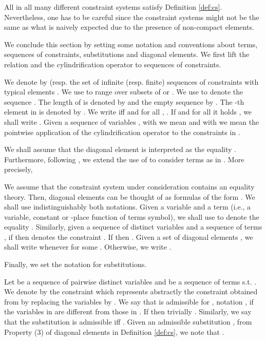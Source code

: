 \documentclass{tlp}
\begin{document}
All in all many different constraint systems satisfy Definition \ref{def:cs}. Nevertheless, one has to be careful since the constraint systems might not be the same as what is naively expected due to the presence of non-compact elements.

We conclude this section by setting some notation and conventions
about terms, sequences of constraints, substitutions and diagonal
elements. We first lift the relation  and the cylindrification
operator to sequences of constraints.

\begin{notation}\label{not:seq-constraints}
We denote  by   (resp.  the set of infinite (resp. finite) sequences of constraints with typical elements . We
use  to range over subsets of  or . 
We use  to denote the sequence .  The length of
 is denoted by  and the  empty sequence by . The
-th element in  is denoted by . 
 We write  iff  and for all , . If   and for all
 it holds , we shall write
. Given a sequence of variables , with   we mean   and 
 with  we mean the pointwise application of the
cylindrification operator to the constraints in . 
 \end{notation}
 
We shall assume that 
the diagonal element 
is  interpreted as the equality . Furthermore, 
following \cite{DBLP:journals/jlp/GiacobazziDL95}, we extend the use of  to consider terms as in . More precisely,


\begin{convention}\label{conv:diag}
We assume that the constraint system under consideration contains an
equality theory. Then, diagonal elements  can be 
thought of as formulas of the form .  
We shall use indistinguishably both notations.  Given a variable  and
a term  (i.e., a variable, constant or -place function of  terms symbol), we shall use  to denote the equality .
Similarly, given a sequence of distinct variables  and a sequence of terms  , if  then     
denotes the constraint .
If  then . Given a set of diagonal elements  , we shall write  whenever  for some . Otherwise, we write .
\end{convention}
 
Finally,  we set the notation for substitutions.


\begin{notation} \label{not:terms}
Let  be a sequence of pairwise distinct variables and  be a sequence of terms s.t. . 
We denote by   the constraint 
which represents abstractly the constraint obtained from  by
replacing the variables  by .
We say that  is admissible for , notation
, if the variables in  are different from those in . 
If  then trivially
.
Similarly, we say that the substitution  is admissible iff
. 
Given an admissible
substitution , from   Property (3) of diagonal elements in Definition \ref{def:cs},  we note that   . 
\end{notation}
\end{document}
